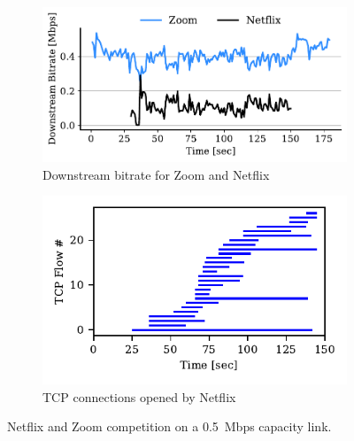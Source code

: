 \begin{figure}[t!]
\centering
\begin{subfigure}[t]{.35\textwidth}
    \centering
    \includegraphics[width=1\textwidth]{figures/comp_ts/zoom_netflix_0.5_dl_r1.pdf}
    \caption{Downstream bitrate for Zoom and Netflix}
    \label{subfig:comp_zoom_netflix_bitrate}
\end{subfigure}\hfill
\begin{subfigure}[t]{.35\textwidth}
    \centering
    \includegraphics[width=1\textwidth]{figures/comp/netflix_connection_0_5.pdf}
    \caption{TCP connections opened by Netflix}
    \label{subfig:comp_netflix_conn}
\end{subfigure}
\caption{Netflix and Zoom competition on a 0.5~Mbps capacity link.}
\label{fig:comp_netflix_zoom}
\end{figure}
